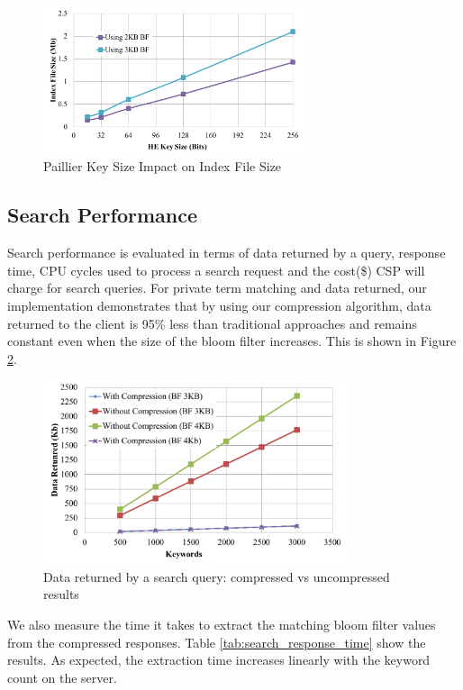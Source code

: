  \begin{figure}
  \centering
  \includegraphics[width= 3in]{figures/paillier_index_size_graph.png}
  \caption{Paillier Key Size Impact on Index File Size}
  \label{fig: pascal-size-exe-time}
\end{figure}

\subsection{Search Performance}

Search performance is evaluated in terms of data returned by a query, response
time, CPU cycles used to process a search request and the cost(\$) CSP will
charge for search queries. 
For private term matching and data returned, our implementation demonstrates
that by using our compression algorithm, data returned to the client
is 95\% less than traditional approaches and remains constant even when the size
of the bloom filter increases. This is shown in Figure \ref{fig:compress}.

\begin{figure}[h!]
  \centering
  \includegraphics[width= 3.5in]{figures/comp_compare.png}
  \caption{Data returned by a search query: compressed vs uncompressed results}
  \label{fig:compress}
\end{figure}

We also measure the time it takes to extract the matching bloom filter values
from the compressed responses.
Table \ref{tab:search_response_time} show the results. As expected, 
the extraction time increases linearly with the keyword count
on the server.


